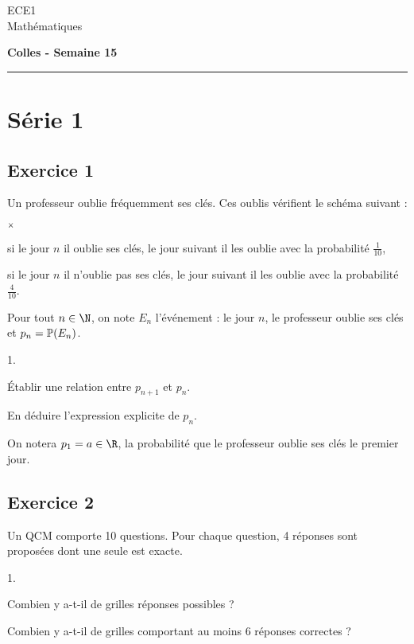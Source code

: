 \documentclass[11pt]{article}%
\begin{document}
\begin{flushleft}
ECE1 \\
Mathématiques
\end{flushleft}

\begin{center}
\textbf{\Large{Colles - Semaine 15}}
\end{center}

\hrule

\vspace*{0,2cm}


\section{Série 1}

\subsection*{Exercice 1}
\noindent
  Un professeur oublie fréquemment ses clés. Ces oublis vérifient le
  schéma suivant :
  \begin{noliste}{$\scriptstyle \times$}
  \item si le jour $n$ il oublie ses clés, le jour suivant il les
    oublie avec la probabilité $\frac{1}{10}$,
  \item si le jour $n$ il n'oublie pas ses clés, le jour 
  suivant il les oublie avec la probabilité $\frac{4}{10}$.
  \end{noliste}
  Pour tout $n \in \N$, on note $E_n$ l'événement : \og le jour $n$,
  le professeur oublie ses clés \fg{} et $p_n = \mathbb{P}(E_n)$.
  \begin{noliste}{1.}
  \item Établir une relation entre $p_{n+1}$ et $p_n$.
  \item En déduire l'expression explicite de $p_n$.
  \end{noliste}
  On notera $p_1 = a \in \R$, la probabilité que le professeur oublie
  ses clés le premier jour.
  
  
\subsection*{Exercice 2}
\noindent
Un QCM comporte 10 questions. Pour chaque question, 4 réponses sont 
proposées dont une seule est exacte.
\begin{noliste}{1.}
 \item Combien y a-t-il de grilles réponses possibles ?
 \item Combien y a-t-il de grilles comportant au moins 6 réponses 
  correctes ?
\end{noliste}~\\[-1.4cm]
\end{document}
